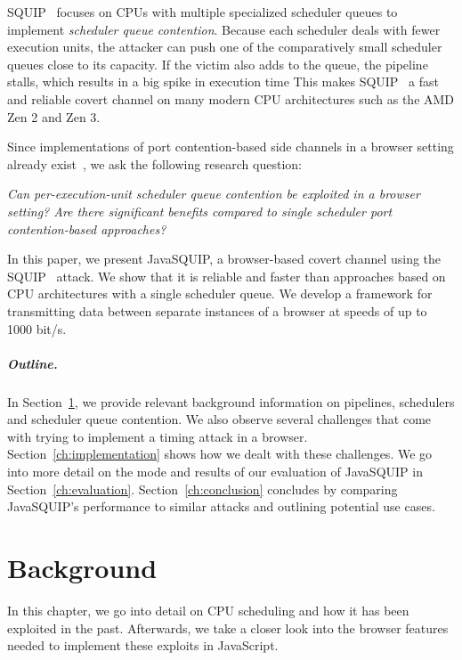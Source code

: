 \documentclass[11pt,
  titlepage=false,
]{scrreprt}
\begin{document}
SQUIP~\cite{squip} focuses on CPUs with multiple specialized scheduler queues to implement \textit{scheduler queue contention}.
Because each scheduler deals with fewer execution units, the attacker can push one of the comparatively small scheduler queues close to its capacity.
If the victim also adds to the queue, the pipeline stalls, which results in a big spike in execution time
This makes SQUIP~\cite{squip} a fast and reliable covert channel on many modern CPU architectures such as the AMD Zen 2 and Zen 3.

Since implementations of port contention-based side channels in a browser setting already exist~\cite{Rokicki2022webport}, we ask the following research question:

\textit{Can per-execution-unit scheduler queue contention be exploited in a browser setting? Are there significant benefits compared to single scheduler port contention-based approaches?}

In this paper, we present JavaSQUIP, a browser-based covert channel using the SQUIP~\cite{squip} attack.
We show that it is reliable and faster than approaches based on CPU architectures with a single scheduler queue.
We develop a framework for transmitting data between separate instances of a browser at speeds of up to 1000 bit/s.

\paragraph{Outline.}
In Section~\ref{ch:background}, we provide relevant background information on pipelines, schedulers and scheduler queue contention.
We also observe several challenges that come with trying to implement a timing attack in a browser.
Section~\ref{ch:implementation} shows how we dealt with these challenges.
We go into more detail on the mode and results of our evaluation of JavaSQUIP in Section~\ref{ch:evaluation}.
Section~\ref{ch:conclusion} concludes by comparing JavaSQUIP's performance to similar attacks and outlining potential use cases.



\chapter{Background}
\label{ch:background}

In this chapter, we go into detail on CPU scheduling and how it has been exploited in the past.
Afterwards, we take a closer look into the browser features needed to implement these exploits in JavaScript.
\end{document}
